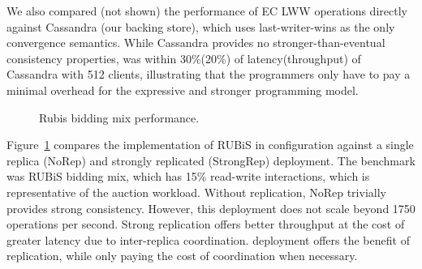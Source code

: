 We also compared (not shown) the performance of EC LWW operations directly
against Cassandra (our backing store), which uses last-writer-wins as the only
convergence semantics. While Cassandra provides no stronger-than-eventual
consistency properties, \quelea was within 30\%(20\%) of latency(throughput) of
Cassandra with 512 clients, illustrating that the programmers only have to pay
a minimal overhead for the expressive and stronger \quelea programming model.

\begin{figure}[t]
  \centering
	\caption{Rubis bidding mix performance.}
  \label{grf:rubis}
\end{figure}


Figure~\ref{grf:rubis} compares the \quelea implementation of RUBiS in 
configuration against a single replica (NoRep) and strongly replicated
(StrongRep)  deployment. The benchmark was RUBiS bidding mix, which has
15\% read-write interactions, which is representative of the auction workload.
Without replication, NoRep trivially provides strong consistency. However, this
deployment does not scale beyond 1750 operations per second. Strong replication
offers better throughput at the cost of greater latency due to inter-replica
coordination. \quelea deployment offers the benefit of replication, while only
paying the cost of coordination when necessary.

